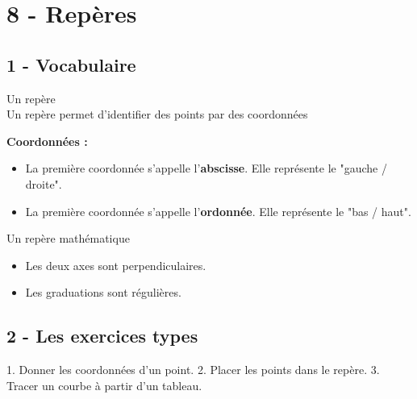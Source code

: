 



\section*{8 - Repères}

\subsection*{1 - Vocabulaire}

\begin{Definition}{Un repère}\\
  Un repère permet d’identifier des points par des coordonnées
 \end{Definition}

 \textbf{Coordonnées : }

 \begin{itemize}[label={$\bullet$}]
   \item La première coordonnée s'appelle l'\textbf{abscisse}. Elle représente le "gauche / droite".
   \item La première coordonnée s'appelle l'\textbf{ordonnée}. Elle représente le "bas / haut".
 \end{itemize}

 \begin{Definition}{Un repère mathématique}\\
    \begin{itemize}[label={$\bullet$}]
    \item Les deux axes sont perpendiculaires.
    \item Les graduations sont régulières. 
  \end{itemize}
 \end{Definition}

 \subsection*{2 - Les exercices types}

1. Donner les coordonnées d'un point.
2. Placer les points dans le repère. 
3. Tracer un courbe à partir d'un tableau. 



